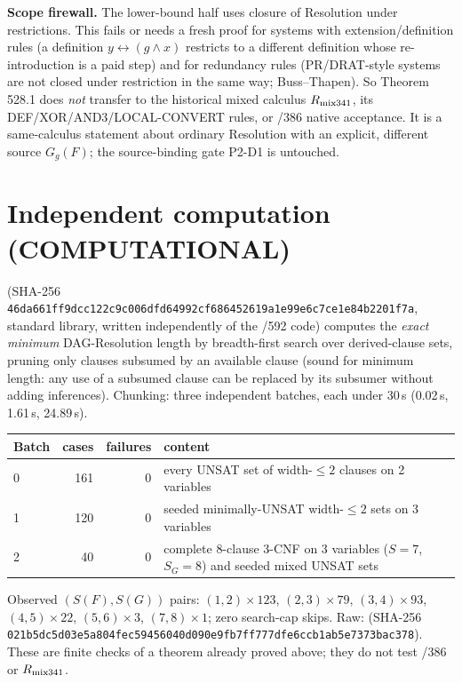 \documentclass[11pt]{article}
\begin{document}
\textbf{Scope firewall.} The lower-bound half uses closure of Resolution under restrictions. This fails or needs a
fresh proof for systems with extension/definition rules (a definition $y\leftrightarrow(g\wedge x)$ restricts to a
different definition whose re-introduction is a paid step) and for redundancy rules (PR/DRAT-style systems are not
closed under restriction in the same way; Buss--Thapen). So Theorem 528.1 does \emph{not} transfer to the historical
mixed calculus $R_{\rm mix341}$, its DEF/XOR/AND3/LOCAL-CONVERT rules, or /386 native acceptance. It is a
same-calculus statement about ordinary Resolution with an explicit, different source $G_g(F)$; the source-binding
gate P2-D1 is untouched.

\section*{Independent computation (COMPUTATIONAL)}
 (SHA-256
\texttt{46da661ff9dcc122c9c006dfd64992cf686452619a1e99e6c7ce1e84b2201f7a}, standard library, written independently of
the /592 code) computes the \emph{exact minimum} DAG-Resolution length by breadth-first search over derived-clause
sets, pruning only clauses subsumed by an available clause (sound for minimum length: any use of a subsumed clause can
be replaced by its subsumer without adding inferences). Chunking: three independent batches, each under 30\,s
(0.02\,s, 1.61\,s, 24.89\,s).
\begin{center}
\begin{tabular}{lrrl}
\toprule
Batch & cases & failures & content\\
\midrule
0 & 161 & 0 & every UNSAT set of width-$\le2$ clauses on 2 variables\\
1 & 120 & 0 & seeded minimally-UNSAT width-$\le2$ sets on 3 variables\\
2 & 40 & 0 & complete 8-clause 3-CNF on 3 variables ($S=7$, $S_G=8$) and seeded mixed UNSAT sets\\
\bottomrule
\end{tabular}
\end{center}
Observed $(S(F),S(G))$ pairs: $(1,2)\times123$, $(2,3)\times79$, $(3,4)\times93$, $(4,5)\times22$, $(5,6)\times3$,
$(7,8)\times1$; zero search-cap skips. Raw: 
(SHA-256 \texttt{021b5dc5d03e5a804fec59456040d090e9fb7ff777dfe6ccb1ab5e7373bac378}). These are finite checks of a
theorem already proved above; they do not test /386 or $R_{\rm mix341}$.
\end{document}

